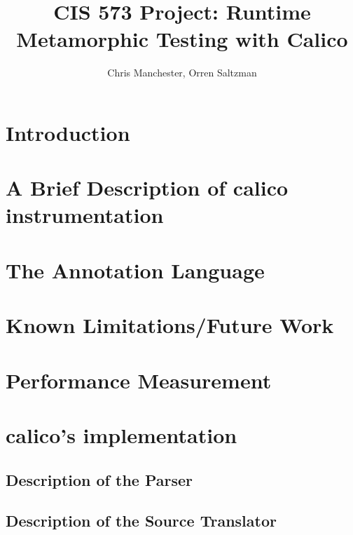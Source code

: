 \documentclass[notitlepage]{article}
\author{Chris Manchester, Orren Saltzman}
\title{CIS 573 Project: Runtime Metamorphic Testing with Calico}
\begin{document}
\maketitle

\section{Introduction}

\section{A Brief Description of calico instrumentation}

\section{The Annotation Language}

\section{Known Limitations/Future Work}

\section{Performance Measurement}

\section{calico's implementation}

\subsection{Description of the Parser}

\subsection{Description of the Source Translator}
\end{document}
